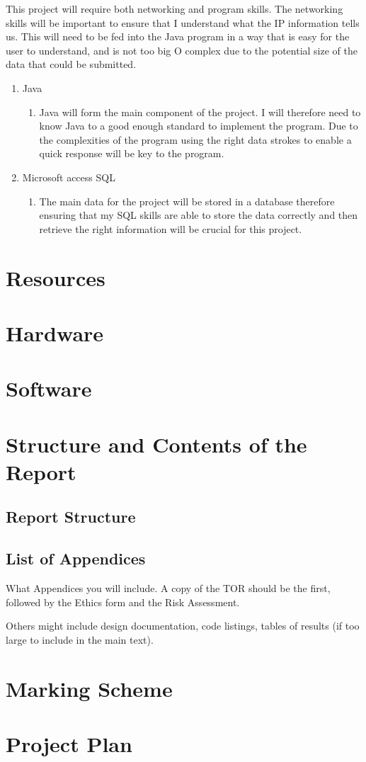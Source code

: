 This project will require both networking and program skills. The networking skills will be important to ensure that I understand what the IP information tells us. This will need to be fed into the Java program in a way that is easy for the user to understand, and is not too big O complex due to the potential size of the data that could be submitted. 
\begin{enumerate}
\item Java 
\begin{enumerate}
    \item Java will form the main component of the project. I will therefore need to know Java to a good enough standard to implement the program. Due to the complexities of the program using the right data strokes to enable a quick response will be key to the program. 
\end{enumerate}
\item Microsoft access SQL
\begin{enumerate}
    \item The main data for the project will be stored in a database therefore ensuring that my SQL skills are able to store the data correctly and then retrieve the right information will be crucial for this project. 
\end{enumerate}
\end{enumerate}

\section{Resources}

\section{Hardware}

\section{Software}

\section{Structure and Contents of the Report}
\subsection{Report Structure}

\subsection{List of Appendices}
What Appendices you will include.  A copy of the TOR should be the first, followed by the Ethics form and the Risk Assessment.

Others might include design documentation, code listings, tables of results (if too large to include in the main text).

\section{Marking Scheme}

\clearpage

\section{Project Plan}
\noindent
{}
